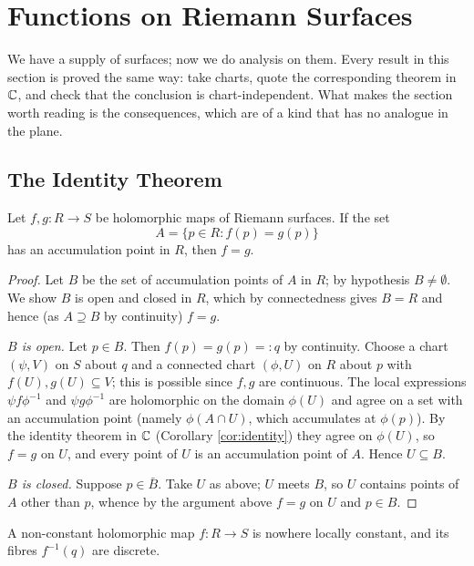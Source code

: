 \documentclass[a4paper]{scrartcl}
\begin{document}
\section{Functions on Riemann Surfaces}

We have a supply of surfaces; now we do analysis on them. Every result in this section is
proved the same way: take charts, quote the corresponding theorem in $\mathbb{C}$, and check that
the conclusion is chart-independent. What makes the section worth reading is the
consequences, which are of a kind that has no analogue in the plane.

\subsection{The Identity Theorem}

\begin{theorem}\label{thm:identityRS}
	Let $f, g : R \to S$ be holomorphic maps of Riemann surfaces. If the set
	$$
	A = \{p \in R : f(p) = g(p)\}
	$$
	has an accumulation point in $R$, then $f = g$.
\end{theorem}

\begin{proof}
	Let $B$ be the set of accumulation points of $A$ in $R$; by hypothesis $B \neq \emptyset$.
	We show $B$ is open and closed in $R$, which by connectedness gives $B = R$ and hence
	(as $A \supseteq B$ by continuity) $f = g$.

	\emph{$B$ is open.} Let $p \in B$. Then $f(p) = g(p) =: q$ by continuity. Choose a chart
	$(\psi, V)$ on $S$ about $q$ and a connected chart $(\phi, U)$ on $R$ about $p$ with
	$f(U), g(U) \subseteq V$; this is possible since $f, g$ are continuous. The local
	expressions $\psi f \phi^{-1}$ and $\psi g\phi^{-1}$ are holomorphic on the domain
	$\phi(U)$ and agree on a set with an accumulation point (namely $\phi(A \cap U)$, which
	accumulates at $\phi(p)$). By the identity theorem in $\mathbb{C}$ (Corollary \ref{cor:identity})
	they agree on $\phi(U)$, so $f = g$ on $U$, and every point of $U$ is an accumulation
	point of $A$. Hence $U \subseteq B$.

	\emph{$B$ is closed.} Suppose $p \in \bar B$. Take $U$ as above; $U$ meets $B$, so $U$
	contains points of $A$ other than $p$, whence by the argument above $f = g$ on $U$ and
	$p \in B$.
\end{proof}

\begin{corollary}\label{cor:notlocallyconstant}
	A non-constant holomorphic map $f : R \to S$ is nowhere locally constant, and its
	fibres $f^{-1}(q)$ are discrete.
\end{corollary}
\end{document}
